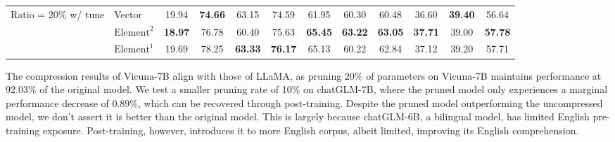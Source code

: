 \documentclass{article}
\begin{document}
\begin{table}[t]
{\begin{tabular}{ll|cc|ccccccc|c}
        \cmidrule{1-12}
        \multirow{4}{*}{\parbox{1.8cm}{Ratio = 20\% w/ tune}} 
        & Vector & 19.94 & \bf 74.66 & 63.15 & 74.59 & 61.95 & 60.30 & 60.48 & 36.60 & \bf 39.40 & 56.64 \\
        & $\text{Element}^2$ & 
        \bf 18.97 & 76.78 & 60.40 & 75.63 & \bf 65.45 & \bf 63.22 & \bf 63.05 & \bf 37.71 & 39.00 & \bf 57.78 \\
        & $\text{Element}^1$ & 19.69 & 78.25 & \bf 63.33 & \bf 76.17 &  65.13 & 60.22 & 62.84 & 37.12 & 39.20 & 57.71\\ 
        \bottomrule
        \bottomrule
    \end{tabular}
    }
\end{table}

The compression results of Vicuna-7B align with those of LLaMA, as pruning 20\% of parameters on Vicuna-7B maintains performance at 92.03\% of the original model. We test a smaller pruning rate of 10\% on chatGLM-7B, where the pruned model only experiences a marginal performance decrease of 0.89\%, which can be recovered through post-training. Despite the pruned model outperforming the uncompressed model, we don't assert it is better than the original model. This is largely because chatGLM-6B, a bilingual model, has limited English pre-training exposure. Post-training, however, introduces it to more English corpus, albeit limited, improving its English comprehension.
\end{document}
